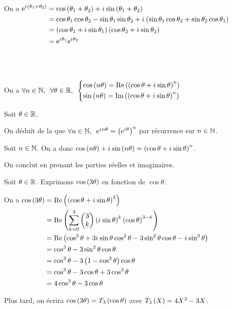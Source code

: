 \begin{dem}
On a \(\begin{aligned}[t]
\e{\i\paren{\theta_1+\theta_2}}&=\cos\paren{\theta_1+\theta_2}+\i\sin\paren{\theta_1+\theta_2} \\
&=\cos\theta_1\cos\theta_2-\sin\theta_1\sin\theta_2+\i\paren{\sin\theta_1\cos\theta_2+\sin\theta_2\cos\theta_1} \\
&=\paren{\cos\theta_1+\i\sin\theta_1}\paren{\cos\theta_2+\i\sin\theta_2} \\
&=\e{\i\theta_1}\e{\i\theta_2}
\end{aligned}\)

~
\end{dem}

\begin{prop}~\\
On a \(\quantifs{\forall n\in\N;\forall\theta\in\R}\begin{dcases}\cos\paren{n\theta}=\Re\paren{\paren{\cos\theta+\i\sin\theta}^n} \\ \sin\paren{n\theta}=\Im\paren{\paren{\cos\theta+\i\sin\theta}^n}\end{dcases}\)
\end{prop}

\begin{dem}
Soit \(\theta\in\R\).

On déduit de la  que \(\quantifs{\forall n\in\N}\e{\i n\theta}=\paren{\e{\i\theta}}^n\) par récurrence sur \(n\in\N\).

Soit \(n\in\N\). On a donc \(\cos\paren{n\theta}+\i\sin\paren{n\theta}=\paren{\cos\theta+\i\sin\theta}^n\).

On conclut en prenant les parties réelles et imaginaires.
\end{dem}

\begin{ex}
Soit \(\theta\in\R\). Exprimons \(\cos\paren{3\theta}\) en fonction de \(\cos\theta\).

On a \(\begin{aligned}[t]
\cos\paren{3\theta}&=\Re\paren{\paren{\cos\theta+\i\sin\theta}^3} \\
&=\Re\paren{\sum_{k=0}^3\binom{k}{3}\paren{\i\sin\theta}^k\paren{\cos\theta}^{3-k}} \\
&=\Re\paren{\cos^3\theta+3\i\sin\theta\cos^2\theta-3\sin^2\theta\cos\theta-\i\sin^3\theta} \\
&=\cos^3\theta-3\sin^2\theta\cos\theta \\
&=\cos^3\theta-3\paren{1-\cos^2\theta}\cos\theta \\
&=\cos^3\theta-3\cos\theta+3\cos^3\theta \\
&=4\cos^3\theta-3\cos\theta
\end{aligned}\)

Plus tard, on écrira \(\cos\paren{3\theta}=\tcheby{3}{\cos\theta}\) avec \(\tcheby{3}{X}=4X^3-3X\).
\end{ex}

